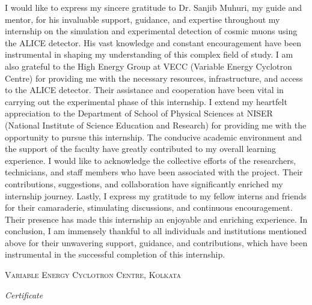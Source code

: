\documentclass{article}
\begin{document}
\vspace{0.2in}
I would like to express my sincere gratitude to Dr. Sanjib Muhuri, 
my guide and mentor, for his invaluable support, guidance, 
and expertise throughout my internship on the simulation and 
experimental detection of cosmic muons using the ALICE detector. 
His vast knowledge and constant encouragement have been instrumental 
in shaping my understanding of this complex field of study.
I am also grateful to the High Energy Group at VECC (Variable 
Energy Cyclotron Centre) for providing me with the necessary 
resources, infrastructure, and access to the ALICE detector. Their 
assistance and cooperation have been vital in carrying out the 
experimental phase of this internship.
I extend my heartfelt appreciation to the Department of School of 
Physical Sciences at NISER (National Institute of Science Education 
and Research) for providing me with the opportunity to pursue this 
internship. The conducive academic environment and the support of the 
faculty have greatly contributed to my overall learning experience.
I would like to acknowledge the collective efforts of the researchers, 
technicians, and staff members who have been associated with the 
project. Their contributions, suggestions, and collaboration have 
significantly enriched my internship journey.
Lastly, I express my gratitude to my fellow interns and 
friends for their camaraderie, stimulating discussions, and 
continuous encouragement. Their presence has made this internship 
an enjoyable and enriching experience.
In conclusion, I am immensely thankful to all individuals 
and institutions mentioned above for their unwavering support, 
guidance, and contributions, which have been instrumental in the 
successful completion of this internship.
\newpage
\restoregeometry











\newpage
\thispagestyle{empty}

\begin{center}

\huge{\textsc{Variable Energy Cyclotron Centre, Kolkata}}\\[1cm]
\normalsize

\emph{\LARGE Certificate}\\[1cm]
\end{center}
\end{document}
